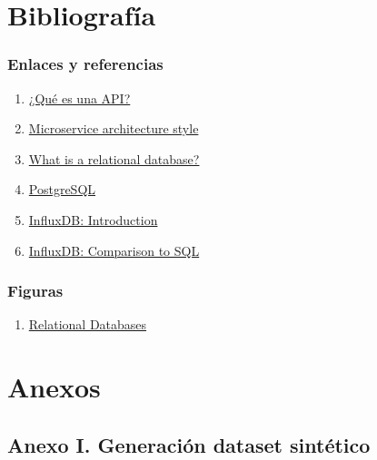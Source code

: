 \documentclass[a4paper, oneside, 12pt]{book}
\begin{document}
	\pagebreak
	
	\chapter{Bibliografía}
	
	\subsection*{Enlaces y referencias}
	
	\begin{enumerate}
		\item
		\label{bib: what is api}
		\href{https://aws.amazon.com/es/what-is/api/}{¿Qué es una API?}
		
		\item
		\label{bib: microservices}
		\href{https://learn.microsoft.com/en-us/azure/architecture/guide/architecture-styles/microservices}{Microservice architecture style}
		
		
		\item
		\label{bib: relational database}
		\href{https://cloud.google.com/learn/what-is-a-relational-database}{What is a relational database?}
		
		
		\item
		\label{bib: postgresql}
		\href{https://www.postgresql.org/}{PostgreSQL}
		
		\item
		\label{bib: influxdb doc}
		\href{https://www.stackhero.io/en/services/InfluxDB/documentations/Introduction#differences-between-influxdb-and-relational-sql-databases}{InfluxDB: Introduction}
		
		
		\item
		\label{bib: influxdb doc vs sql}
		\href{https://archive.docs.influxdata.com/influxdb/v1.2/concepts/crosswalk/}{InfluxDB: Comparison to SQL}
		
	\end{enumerate}

	\vspace{20px}
	
	\subsection*{Figuras}

	\begin{enumerate}
		\item
		\label{bib_img: example sql}
		\href{https://xbsoftware.com/blog/main-types-of-database-management-systems/}{Relational Databases}
	\end{enumerate}
	
	\pagebreak
	
	\chapter*{Anexos}
	
	\section*{Anexo I. Generación dataset sintético}
	
\end{document}
